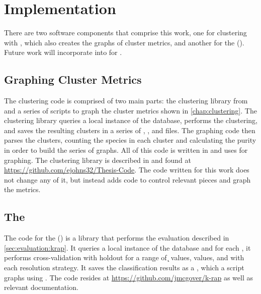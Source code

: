 \chapter{Implementation}\label{chap:implementation}
There are two software components that comprise this work, one for clustering with \dbscan{}, which also creates the graphs of cluster metrics, and another for the \kraplong{} (\krap{}).
Future work will incorporate \krap{} into \cplop{} for \mstlong{}.

\section{Graphing Cluster Metrics}
The clustering code is comprised of two main parts: the clustering library from \cite{johnson2015density} and a series of scripts to graph the cluster metrics shown in \autoref{chap:clustering}.
The clustering library queries a local instance of the \cplop{} database, performs the clustering, and saves the resulting clusters in a series of \pickle{}, \json{}, and \csv{} files.
The graphing code then parses the clusters, counting the species in each cluster and calculating the purity in order to build the series of graphs.
All of this code is written in \python{} and uses \matplotlib{} for graphing.
The clustering library is described in \cite{johnson2015density}and found at \url{https://github.com/ejohns32/Thesis-Code}.
The code written for this work does not change any of it, but instead adds code to control relevant pieces and graph the metrics.

\section{The \kraplong{}}
The code for the \kraplong{} (\krap{}) is a \java{} library that performs the evaluation described in \autoref{sec:evaluation:krap}.
It queries a local instance of the \cplop{} database and for each \cplop{} \isol{}, it performs cross-validation with holdout for a range of \k{} values, \a{} values, and with each resolution strategy.
It saves the classification results as a \csv{}, which a \python{} script graphs using \matplotlib{}.
The code resides at \url{https://github.com/jmcgover/k-rap} as well as relevant documentation.